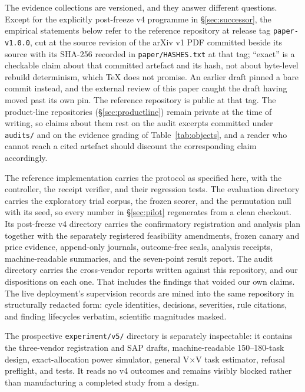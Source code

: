 \documentclass[11pt]{article}
\begin{document}
The evidence collections are versioned, and they answer different questions. Except for the explicitly post-freeze v4 programme in \S\ref{sec:successor}, the empirical statements below refer to the reference repository at release tag \texttt{paper-v1.0.0}, cut at the source revision of the arXiv v1 PDF committed beside its source with its SHA-256 recorded in \texttt{paper/HASHES.txt} at that tag; ``exact'' is a checkable claim about that committed artefact and its hash, not about byte-level rebuild determinism, which TeX does not promise. An earlier draft pinned a bare commit instead, and the external review of this paper caught the draft having moved past its own pin. The reference repository is public at that tag. The product-line repositories (\S\ref{sec:productline}) remain private at the time of writing, so claims about them rest on the audit excerpts committed under \texttt{audits/} and on the evidence grading of Table~\ref{tab:objects}, and a reader who cannot reach a cited artefact should discount the corresponding claim accordingly.

The reference implementation carries the protocol as specified here, with the controller, the receipt verifier, and their regression tests. The evaluation directory carries the exploratory trial corpus, the frozen scorer, and the permutation null with its seed, so every number in \S\ref{sec:pilot} regenerates from a clean checkout. Its post-freeze v4 directory carries the confirmatory registration and analysis plan together with the separately registered feasibility amendments, frozen canary and price evidence, append-only journals, outcome-free seals, analysis receipts, machine-readable summaries, and the seven-point result report. The audit directory carries the cross-vendor reports written against this repository, and our dispositions on each one. That includes the findings that voided our own claims. The live deployment's supervision records are mined into the same repository in structurally redacted form: cycle identities, decisions, severities, rule citations, and finding lifecycles verbatim, scientific magnitudes masked.

The prospective \texttt{experiment/v5/} directory is separately inspectable: it contains the three-vendor registration and SAP drafts, machine-readable 150--180-task design, exact-allocation power simulator, general V$\times$V task estimator, refusal preflight, and tests. It reads no v4 outcomes and remains visibly blocked rather than manufacturing a completed study from a design.
\end{document}
